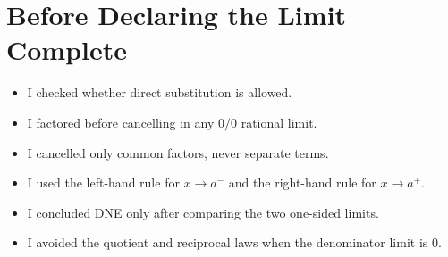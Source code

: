 \documentclass[11pt,oneside]{book}
\begin{document}
\chapter*{Before Declaring the Limit Complete}
\begin{itemize}[leftmargin=*]
\item I checked whether direct substitution is allowed.
\item I factored before cancelling in any $0/0$ rational limit.
\item I cancelled only common factors, never separate terms.
\item I used the left-hand rule for $x\to a^-$ and the right-hand rule for $x\to a^+$.
\item I concluded DNE only after comparing the two one-sided limits.
\item I avoided the quotient and reciprocal laws when the denominator limit is $0$.
\end{itemize}
\end{document}
